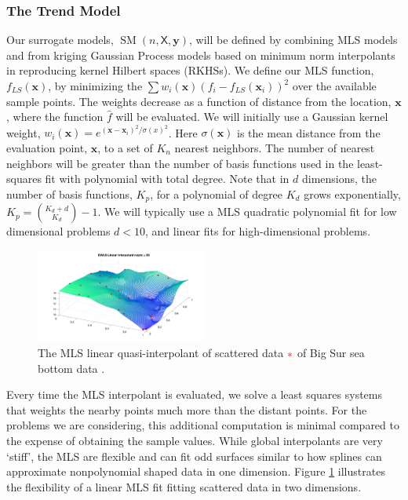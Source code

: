 \documentclass[11pt]{NSFamsart}
\DeclareMathOperator{\SURR}{SM} %
\newcommand{\mX}{\mathsf{X}}
\newcommand{\bx}{{\boldsymbol{x}}}
\newcommand{\by}{{\boldsymbol{y}}}
\begin{document}
\subsubsection{The Trend Model}

Our surrogate models, $\SURR(n,\mX,\by)$, will be defined by combining MLS models and from kriging Gaussian Process models based on minimum norm interpolants in reproducing kernel Hilbert spaces (RKHSs).   We define our MLS function, $f_{LS}(\bx)$, by minimizing the $\sum w_i(\bx) (f_i - f_{LS}(\bx_i))^2$ over the available sample points.  The weights decrease as a function of distance from the location, $\bx$, where the function $\hat f$ will be evaluated.   We will initially use a Gaussian kernel weight,  $w_i(\bx) = e^{(\bx-\bx_i)^2/\sigma(x)^2}$.  
Here $\sigma(\bx)$ is the mean distance from the evaluation point, $\bx$, to a set of $K_n$ nearest neighbors.  The number of nearest neighbors will be greater than the number of basis functions used in the least-squares fit with polynomial with total degree.  Note that in $d$ dimensions, the number of basis functions, $K_p$,  for a polynomial of degree $K_d$ grows exponentially, $K_p={K_d + d \choose K_d} -1$.  
We will typically use a MLS quadratic polynomial fit for low dimensional problems $d<10$, and linear fits for high-dimensional problems.    

\begin{figure}
	  \begin{center}
	\includegraphics[width = 0.5\textwidth]{ProgramsImages/bigsurT.pdf}
	 \end{center}
	\caption{The  MLS linear quasi-interpolant of scattered data {$\color{red}*$} of  Big Sur sea bottom data \cite{franke1979critical}.
	\label{MLS}}
\end{figure}
Every time the MLS interpolant is evaluated, we  solve a least squares systems that  weights the nearby points much more than the distant points.  For the problems we are considering, this additional computation is minimal compared to the expense of obtaining the sample values.  While global interpolants are very `stiff', the MLS are flexible and can fit odd surfaces similar to how splines can approximate nonpolynomial shaped data in one dimension.  
 Figure \ref{MLS} illustrates the flexibility of a linear MLS fit fitting scattered data in two dimensions.  
\end{document}

